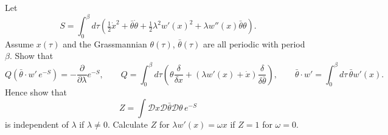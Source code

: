 Let
\begin{equation}
    S = \int_0^\beta d\tau\left(\tfrac{1}{2}\dot x^2 + \bar\theta\dot\theta + \tfrac{1}{2}\lambda^2 w'(x)^2 + \lambda w''(x)\bar\theta\theta\right).
\end{equation}
Assume $x(\tau)$ and the Grassmannian $\theta(\tau)$, $\bar\theta(\tau)$ are all periodic with period $\beta$. Show that
\begin{equation}
    Q\!\left(\bar\theta\cdot w'\,e^{-S}\right) = -\frac{\partial}{\partial\lambda}e^{-S}, \qquad Q = \int_0^\beta d\tau\left(\theta\frac{\delta}{\delta x} + \left(\lambda w'(x)+\dot x\right)\frac{\delta}{\delta\bar\theta}\right), \qquad \bar\theta\cdot w' = \int_0^\beta d\tau\,\bar\theta w'(x).
\end{equation}
Hence show that
\begin{equation}
    Z = \int \mathcal{D}x\mathcal{D}\bar\theta\mathcal{D}\theta\,e^{-S}
\end{equation}
is independent of $\lambda$ if $\lambda\neq 0$. Calculate $Z$ for $\lambda w'(x) = \omega x$ if $Z=1$ for $\omega=0$.
